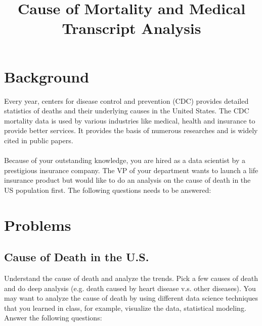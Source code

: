 \documentclass{article}
\title{Cause of Mortality and Medical Transcript Analysis} %
\begin{document}
\maketitle %

\thispagestyle{fancy}
\pagestyle{fancy}

\section{Background}
Every year, centers for disease control and prevention (CDC) provides detailed statistics of deaths and their underlying causes in the United States. The CDC mortality data is used by various industries like medical, health and insurance to provide better services. It provides the basis of numerous researches and is widely cited in public papers.\\\\
Because of your outstanding knowledge, you are hired as a data scientist by a prestigious insurance company. The VP of your department wants to launch a life insurance product but would like to do an analysis on the cause of death in the US population first. The following questions needs to be answered:

\section{Problems}
\subsection{Cause of Death in the U.S.}
Understand the cause of death and analyze the trends. Pick a few causes of death and do deep analysis (e.g.  death caused by heart disease v.s. other diseases). You may want to analyze the cause of death by using different data science techniques that you learned in class, for example, visualize the data, statistical modeling. Answer the following questions:
\end{document}
